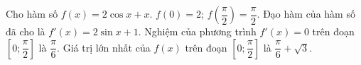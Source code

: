 \begin{ex}
Cho hàm số $f(x)=2\cos x+x$.
\choiceTF
{\True $f(0)=2$; $f\!\left(\dfrac{\pi}{2}\right)=\dfrac{\pi}{2}$.}
{Đạo hàm của hàm số đã cho là $f'(x)=2\sin x+1$.}
{\True Nghiệm của phương trình $f'(x)=0$ trên đoạn $\left[0;\dfrac{\pi}{2}\right]$ là $\dfrac{\pi}{6}$.}
{\True Giá trị lớn nhất của $f(x)$ trên đoạn $\left[0;\dfrac{\pi}{2}\right]$ là $\dfrac{\pi}{6}+\sqrt3$.}
\end{ex}
